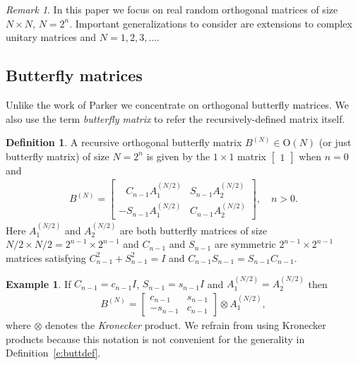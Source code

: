 \documentclass{amsart}
\theoremstyle{definition}
\newtheorem{definition}[theorem]{Definition}
\newtheorem{example}[theorem]{Example}
\theoremstyle{remark}
\newtheorem{remark}[theorem]{Remark}
\numberwithin{equation}{section}
\begin{document}
\begin{remark}
In this paper we focus on real random orthogonal matrices of size $N \times N$, $N = 2^n$.  Important generalizations to consider are extensions to complex unitary matrices and $N = 1,2,3,\ldots$.
\end{remark}

\subsection{Butterfly matrices}\label{s:butterfly}

Unlike the work of Parker \cite{Parker1995} we concentrate on orthogonal butterfly matrices.  We also use the term \emph{butterfly matrix} to refer the recursively-defined matrix itself.
\newcommand{\pp}[1]{^{(#1)}}
\begin{definition}
A recursive orthogonal butterfly matrix $B\pp{N} \in \mathrm{O}(N)$ (or just butterfly matrix) of size $N = 2^n$ is given by the $1\times 1$ matrix $\begin{bmatrix} 1 \end{bmatrix}$ when $n = 0$ and
\begin{align}\label{e:buttdef}
B \pp{N} = \begin{bmatrix} \phantom{.}~~C_{n-1} A_1\pp{N/2}  & S_{n-1} A_2\pp{N/2}  \\ - S_{n-1} A_1 \pp{N/2}  & C_{n-1} A_2\pp{N/2}  \end{bmatrix}, \quad n > 0.
\end{align} 
Here $A_1\pp{N/2}$ and $A_2\pp{N/2}$ are both butterfly matrices of size $N/2 \times N/2 = 2^{n-1} \times 2^{n-1}$ and $C_{n-1}$ and $S_{n-1}$ are symmetric $2^{n-1}\times 2^{n-1}$ matrices satisfying $C_{n-1}^2 + S_{n-1}^2 = I$ and $C_{n-1}S_{n-1} = S_{n-1}C_{n-1}$.
\end{definition}

\begin{example}
  If $C_{n-1}= c_{n-1}I$, $S_{n-1} = s_{n-1}I$ and $A_1\pp{N/2} = A_2\pp{N/2}$ then
  \begin{align}
    B\pp{N} = \begin{bmatrix} c_{n-1} & s_{n-1} \\ - s_{n-1} & c_{n-1} \end{bmatrix} \otimes A_1 \pp{N/2},
  \end{align}
  where $\otimes$ denotes the \emph{Kronecker} product.  We refrain from using Kronecker products because this notation is not convenient for the generality in Definition~\ref{e:buttdef}.
\end{example}  
\end{document}
